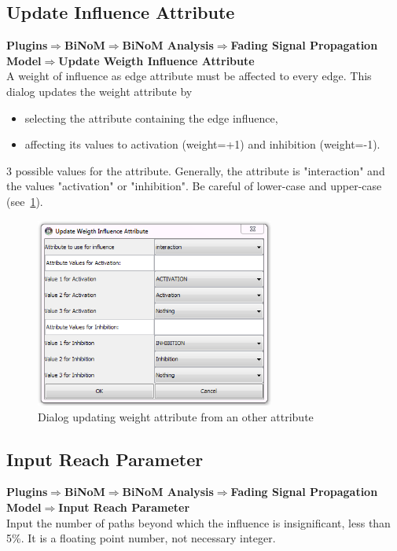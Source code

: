 \subsection{Update Influence Attribute}
\textbf{Plugins$\Rightarrow$BiNoM$\Rightarrow$BiNoM Analysis$\Rightarrow$Fading Signal Propagation Model$\Rightarrow$Update Weigth Influence Attribute}\\
A weight of influence as edge attribute must be affected to every edge. This dialog updates the weight attribute by 
\begin{itemize}
\item selecting the attribute containing the edge influence,
\item affecting its values to activation (weight=+1) and inhibition (weight=-1).
\end{itemize}
3 possible values for the attribute. Generally, the attribute is "interaction" and the values "activation" or "inhibition". Be careful of lower-case and upper-case (see~\ref{Weight_Attribute_Dialog}).

\begin{figure}
\centering
\includegraphics[width=0.7\textwidth]{graphics/Weight_Attribute_Dialog}
\caption{Dialog updating weight attribute from an other attribute}
\label{Weight_Attribute_Dialog}
\end{figure}

\subsection{Input Reach Parameter}
\textbf{Plugins$\Rightarrow$BiNoM$\Rightarrow$BiNoM Analysis$\Rightarrow$Fading Signal Propagation Model$\Rightarrow$Input Reach Parameter}\\
Input the number of paths beyond which the influence is insignificant, less than 5\%. It is a floating point number, not necessary integer.

